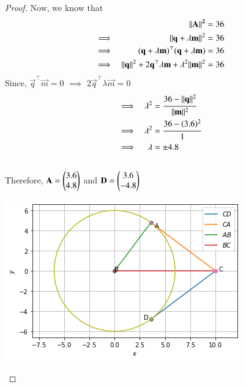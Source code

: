 \documentclass[journal,12pt,twocolumn]{IEEEtran}
\begin{document}
\begin{enumerate}
\begin{proof}
Now, we know that
\begin{align}
&&\mathbf{\lVert A\rVert^2} &= 36\\
&\implies& \lVert\mathbf{q}+\lambda \mathbf{m}\rVert^2 &= 36\\
&\implies& (\mathbf{q}+\lambda \mathbf{m})^\top(\mathbf{q}+\lambda \mathbf{m})&= 36\\
&\implies& \lVert\mathbf{q}\rVert^2 + 2\mathbf{q}^\top \lambda \mathbf{m} + \lambda^2 \lVert\mathbf{m}\rVert^2 &= 36
\end{align}
Since, $\vec{q}^\top \vec{m} = 0$ $\implies$
$2\vec{q}^\top \lambda \vec{m} = 0$
\begin{align}
&\implies&\lambda^2 &= \cfrac{36-\lVert\mathbf{q}\rVert^2}{\lVert\mathbf{m}\rVert^2}\\
&\implies& \lambda^2 &= \cfrac{36-(3.6)^2}{1}\\
&\implies& \lambda &= \pm 4.8
\end{align}\\
Therefore, $\mathbf{A} = \begin{pmatrix}3.6 \\ 4.8\end{pmatrix}$ and $\mathbf{D} = \begin{pmatrix}3.6 \\ -4.8\end{pmatrix}$ 
\begin{center}
    \includegraphics{assignment3.png}
\end{center}
\end{proof}
\end{enumerate}
\end{document}
